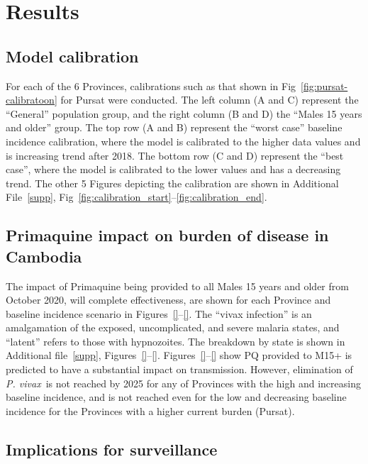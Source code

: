 \documentclass[doublespacing]{bmcart}
\newcommand{\pv}{\textit{P. vivax}}
\begin{document}
\section*{Results}

\subsection*{Model calibration}
For each of the 6 Provinces, calibrations such as that shown in Fig~\ref{fig:pursat-calibratoon} for Pursat were conducted. The left column (A and C) represent the ``General'' population group, and the right column (B and D) the ``Males 15 years and older'' group. The top row (A and B) represent the ``worst case'' baseline incidence calibration, where the model is calibrated to the higher data values and is increasing trend after 2018. The bottom row (C and D) represent the ``best case'', where the model is calibrated to the lower values and has a decreasing trend. The other 5 Figures depicting the calibration are shown in Additional File~\ref{supp}, Fig~\ref{fig:calibration_start}--\ref{fig:calibration_end}.

\subsection*{Primaquine impact on burden of disease in Cambodia}

The impact of Primaquine being provided to all Males 15 years and older from October 2020, will complete effectiveness, are shown for each Province and baseline incidence scenario in Figures~\ref{}--\ref{}. The ``vivax infection'' is an amalgamation of the exposed, uncomplicated, and severe malaria states, and ``latent'' refers to those with hypnozoites. The breakdown by state is shown in Additional file~\ref{supp}, Figures~\ref{}--\ref{}. Figures~\ref{}--\ref{} show PQ provided to M15+ is predicted to have a substantial impact on transmission. However, elimination of \pv~is not reached by 2025 for any of Provinces with the high and increasing baseline incidence, and is not reached even for the low and decreasing baseline incidence for the Provinces with a higher current burden (Pursat). 

\subsection*{Implications for surveillance}
\end{document}
